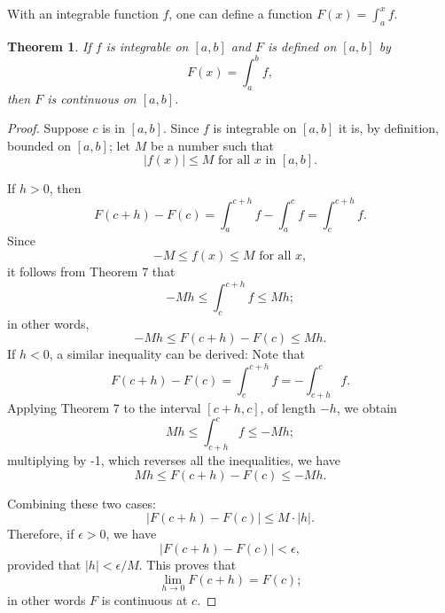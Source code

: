 \documentclass{article}
\newtheorem{theorem}{Theorem}
\begin{document}
With an integrable function $f$, one can define a function $F(x) = \int_a^x f$.

\begin{theorem}
  If $f$ is integrable on $[a, b]$ and $F$ is defined on $[a, b]$ by
  \begin{equation*}
    F(x) = \int_a^b f,
  \end{equation*} then $F$ is continuous on $[a, b]$.
\end{theorem}

\begin{proof}
  Suppose $c$ is in $[a, b]$. Since $f$ is integrable on $[a, b]$ it is, by
  definition, bounded on $[a, b]$; let $M$ be a number such that
  \begin{equation*}
    |f(x)| \leq M \text{ for all } x \text{ in } [a, b].
  \end{equation*}

  If $h > 0$, then \begin{equation*}
    F(c + h) - F(c) = \int_a^{c + h} f - \int_a^c f = \int_c^{c + h} f.
  \end{equation*} Since \begin{equation*}
    -M \leq f(x) \leq M \text{ for all } x,
  \end{equation*} it follows from Theorem 7 that \begin{equation*}
    -Mh \leq \int_c^{c + h} f \leq Mh;
  \end{equation*} in other words, \begin{equation*}
    -Mh \leq F(c + h) - F(c) \leq Mh.
  \end{equation*} If $h < 0$, a similar inequality can be derived: Note that
  \begin{equation*}
    F(c + h) - F(c) = \int_c^{c + h} f = -\int_{c + h}^c f.
  \end{equation*} Applying Theorem 7 to the interval $[c + h, c]$, of length
  $-h$, we obtain \begin{equation*}
    Mh \leq \int_{c + h}^c f \leq -Mh;
  \end{equation*} multiplying by -1, which reverses all the inequalities, we
  have \begin{equation*}
    Mh \leq F(c + h) - F(c) \leq -Mh.
  \end{equation*}

  Combining these two cases: \begin{equation*}
    |F(c + h) - F(c)| \leq M \cdot |h|.
  \end{equation*} Therefore, if $\epsilon > 0$, we have \begin{equation*}
    |F(c + h) - F(c)| < \epsilon,
  \end{equation*} provided that $|h| < \epsilon/M$. This proves that
  \begin{equation*}
    \lim_{h \rightarrow 0} F(c + h) = F(c);
  \end{equation*} in other words $F$ is continuous at $c$.
\end{proof}
\end{document}
